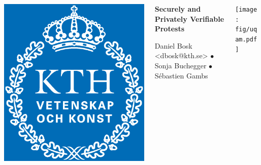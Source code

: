 \begin{columns}
  \begin{column}{0.17\linewidth}
    \includegraphics[width=0.5\linewidth]{fig/kth_cmyk.eps}
    \hfill
  \end{column}
  \hfill
  \begin{column}{0.64\linewidth}
    \begin{center}
      \Huge\bfseries
      Securely and Privately Verifiable Protests
    \end{center}
    \begin{center}
      \large
      Daniel Bosk <dbosk@kth.se>
      $\bullet$
      Sonja Buchegger
      $\bullet$
      Sébastien Gambs
    \end{center}
    \vspace{1.5em}
  \end{column}
  \hfill
  \begin{column}{0.17\linewidth}
    \hfill
    \texttt{[image: fig/uqam.pdf]}
  \end{column}
\end{columns}


